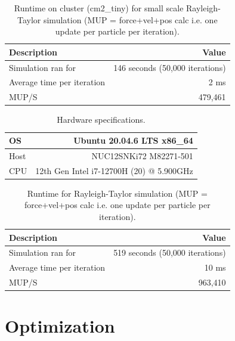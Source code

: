 \documentclass{article}
\begin{document}
\begin{table}[h!]
    \centering
    \begin{tabular}{|l|r|}
        \hline
        \textbf{Description} & \textbf{Value} \\ \hline
        Simulation ran for & 146 seconds (50,000 iterations) \\ \hline
        Average time per iteration & 2 ms \\ \hline
        MUP/S & 479,461 \\ \hline
    \end{tabular}
    \caption{Runtime on cluster (cm2\_tiny) for small scale Rayleigh-Taylor simulation (MUP = force+vel+pos calc i.e. one update per particle per iteration). }
    \label{table:small_raileigh}
\end{table}

\begin{table}[h!]
    \centering
    \begin{tabular}{|l|r|}
        \hline
        OS & Ubuntu 20.04.6 LTS x86\_64 \\ \hline
        Host & NUC12SNKi72 M82271-501 \\ \hline
        CPU & 12th Gen Intel i7-12700H (20) @ 5.900GHz \\ \hline
    \end{tabular}
    \caption{Hardware specifications.}
    \label{table:specs}
\end{table}

\begin{table}[h!]
    \centering
    \begin{tabular}{|l|r|}
        \hline
        \textbf{Description} & \textbf{Value} \\ \hline
        Simulation ran for & 519 seconds (50,000 iterations) \\ \hline
        Average time per iteration & 10 ms \\ \hline
        MUP/S & 963,410 \\ \hline
    \end{tabular}
    \caption{Runtime for Rayleigh-Taylor simulation (MUP = force+vel+pos calc i.e. one update per particle per iteration). }
    \label{table:rayleigh_base}
\end{table}

\section{Optimization}
\label{sec:opt}
\end{document}
